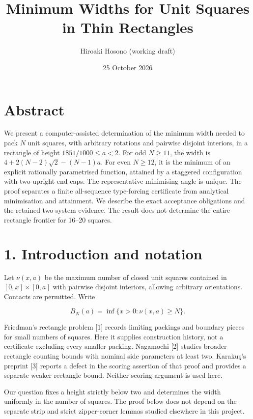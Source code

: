 \documentclass[
  11pt,
  a4paper,
]{article}
\title{Minimum Widths for Unit Squares in Thin Rectangles}
\author{Hiroaki Hosono (working draft)}
\date{25 October 2026}
\begin{document}
\maketitle

\section{Abstract}\label{abstract}

We present a computer-assisted determination of the minimum width needed
to pack \(N\) unit squares, with arbitrary rotations and pairwise
disjoint interiors, in a rectangle of height \(1851/1000\le a<2\). For
odd \(N\ge11\), the width is \(4+2(N-2)\sqrt2-(N-1)a\). For even
\(N\ge12\), it is the minimum of an explicit rationally parametrised
function, attained by a staggered configuration with two upright end
caps. The representative minimising angle is unique. The proof separates
a finite all-sequence type-forcing certificate from analytical
minimisation and attainment. We describe the exact acceptance
obligations and the retained two-system evidence. The result does not
determine the entire rectangle frontier for 16--20 squares.

\section{1. Introduction and notation}\label{introduction-and-notation}

Let \(\nu(x,a)\) be the maximum number of closed unit squares contained
in \([0,x]\times[0,a]\) with pairwise disjoint interiors, allowing
arbitrary orientations. Contacts are permitted. Write

\[
B_N(a)=\inf\{x>0:\nu(x,a)\ge N\}.
\]

Friedman's rectangle problem {[}1{]} records limiting packings and
boundary pieces for small numbers of squares. Here it supplies
construction history, not a certificate excluding every smaller packing.
Nagamochi {[}2{]} studies broader rectangle counting bounds with nominal
side parameters at least two. Karakuş's preprint {[}3{]} reports a
defect in the scoring assertion of that proof and provides a separate
weaker rectangle bound. Neither scoring argument is used here.

Our question fixes a height strictly below two and determines the width
uniformly in the number of squares. The proof below does not depend on
the separate strip and strict zipper-corner lemmas studied elsewhere in
this project.
\end{document}
